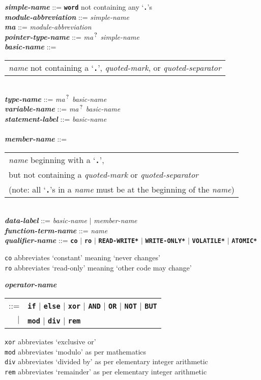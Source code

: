 \documentclass[12pt]{article}
\newcommand{\TT}[1]{{\tt \bfseries #1}}
\newcommand{\QMARK}{{$^{\,\mbox{\footnotesize ?}}$}}
\newcommand{\MA}{{\em ma}\QMARK}
\newcommand{\ttkey}[1]{{\tt \bfseries #1}}
\newcommand{\emkey}[1]{{\em \bfseries #1}}
\newcommand{\ttakey}[1]{{\tt \bfseries *#1*}}
\newenvironment{indpar}[1][0.3in]%
	{\begin{list}{}%
		     {\setlength{\itemsep}{0in}%
		      \setlength{\topsep}{0in}%
		      \setlength{\parsep}{1ex}%
		      \setlength{\labelwidth}{#1}%
		      \setlength{\leftmargin}{#1}%
		      \addtolength{\leftmargin}{\labelsep}}%
	 \item}%
	{\end{list}}
\begin{document}
\begin{indpar}
\emkey{simple-name} ::= \TT{word} not containing any `\TT{.}'s \\
\emkey{module-abbreviation} ::= {\em simple-name} \\
\emkey{ma} ::= {\em module-abbreviation} \\
\emkey{pointer-type-name}\label{POINTER-TYPE-NAME} ::=
    \MA{} {\em simple-name}
\\[1ex]
\emkey{basic-name}
	::= \begin{tabular}[t]{@{}l@{}}
	    {\em name} not containing a `\TT{.}', {\em quoted-mark}, or
	    {\em quoted-separator}
	    \end{tabular} \\
\emkey{type-name}\label{TYPE-NAME} ::=
    \MA{} {\em basic-name} \\
\emkey{variable-name}\label{VARIABLE-NAME} ::=
    \MA{} {\em basic-name} \\
\emkey{statement-label} ::= {\em basic-name}
    \label{STATEMENT-LABEL} \\
\\[1ex]
\emkey{member-name}\label{MEMBER-NAME}
	::= \begin{tabular}[t]{@{}l@{}}
                        {\em name} beginning with a `\TT{.}', \\
			but not containing a {\em quoted-mark} or
			    {\em quoted-separator} \\
			(note: all `\TT{.}'s in a {\em name} must be at
			 the beginning of the {\em name})
			\end{tabular} \\
\emkey{data-label}\label{DATA-LABEL} ::=
    {\em basic-name} $|$ {\em member-name}
\\[1ex]
\emkey{function-term-name} ::= {\em name}
    \label{FUNCTION-TERM-NAME}
\\[1ex]
\emkey{qualifier-name}\label{QUALIFIER-NAME} ::=
    \ttkey{co} $|$ \ttkey{ro} $|$ \ttakey{READ-WRITE} $|$
    \ttakey{WRITE-ONLY} $|$ \ttakey{VOLATILE} $|$ \ttakey{ATOMIC}
\begin{indpar}
{\tt co} abbreviates `constant' meaning `never changes' \\
{\tt ro} abbreviates `read-only' meaning `other code may change'
\end{indpar}
\emkey{operator-name}
    \begin{tabular}[t]{rl}
    ::= & \TT{if} $|$ \TT{else}
                  $|$ \TT{xor} $|$ \TT{AND} $|$ \TT{OR}
		  $|$ \TT{NOT} $|$ \TT{BUT}  \\
    $|$ & \TT{mod} $|$ \TT{div} $|$ \TT{rem}
    \end{tabular}
\begin{indpar}
{\tt xor} abbreviates `exclusive or' \\
{\tt mod} abbreviates `modulo' as per mathematics \\
{\tt div} abbreviates `divided by' as per elementary integer arithmetic \\
{\tt rem} abbreviates `remainder' as per elementary integer arithmetic
\end{indpar}


\end{indpar}
\end{document}
